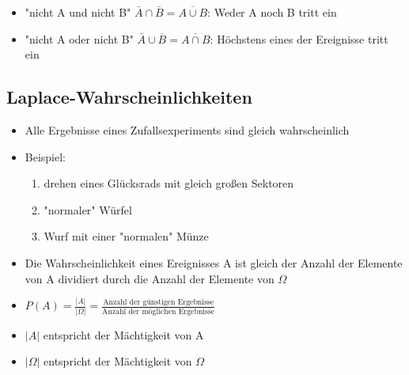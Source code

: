 \documentclass[a4paper,twocolumn,10pt]{onepgnote1}
\begin{document}
\begin{itemize}
\item "nicht A und nicht B" $\bar{A} \cap \bar{B} = \overline{A\cup B}$: Weder A noch B tritt ein\\ 
\item "nicht A oder nicht B" $\bar{A} \cup \overline{B} = \overline{A \cap B}$: Höchstens eines der Ereignisse tritt ein \\ 
\end{itemize}
\subsection{Laplace-Wahrscheinlichkeiten}
\begin{itemize}
    \item Alle Ergebnisse eines Zufallsexperiments sind gleich wahrscheinlich
    \item Beispiel:
    \begin{enumerate}
        \item drehen eines Glücksrads mit gleich großen Sektoren
        \item "normaler" Würfel
        \item Wurf mit einer "normalen" Münze
    \end{enumerate}
    \item Die Wahrscheinlichkeit eines Ereignisses A ist gleich der Anzahl der Elemente von A dividiert durch die Anzahl der Elemente von $\Omega$
    \item $P(A) = \frac{|A|}{|\Omega |} = \frac{\text{Anzahl der günstigen Ergebnisse}}{\text{Anzahl der möglichen Ergebnisse}}$
    \item $|A|$ entspricht der Mächtigkeit von A
    \item $|\Omega|$ entspricht der Mächtigkeit von $\Omega$
\end{itemize}
\end{document}
